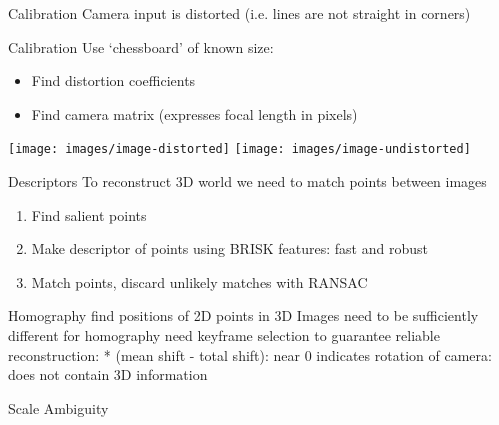 \documentclass{beamer}
\begin{document}
\begin{frame}{Calibration}
	Camera input is distorted (i.e. lines are not straight in corners)

\end{frame}

\begin{frame}{Calibration}
	Use `chessboard' of known size:
	\begin{itemize}
		\item Find distortion coefficients
		\item Find camera matrix (expresses focal length in pixels)
	\end{itemize}

	\begin{center}
		\texttt{[image: images/image-distorted]}
		\texttt{[image: images/image-undistorted]}
	\end{center}
\end{frame}

\begin{frame}{Descriptors}
	To reconstruct 3D world we need to match points between images
	\begin{enumerate}
		\item Find salient points
		\item Make descriptor of points using BRISK features: fast and robust
			\cite{Leutenegger2011}
		\item Match points, discard unlikely matches with RANSAC
			\cite{fischler1981random}
	\end{enumerate}
\end{frame}

\begin{frame}{Homography}
	find positions of 2D points in 3D
	Images need to be sufficiently different for homography
	need keyframe selection to guarantee reliable reconstruction:
	* (mean shift - total shift):
	  near 0 indicates rotation of camera: does not contain 3D information
\end{frame}

\begin{frame}{Scale Ambiguity}
	
\end{frame}
\end{document}
